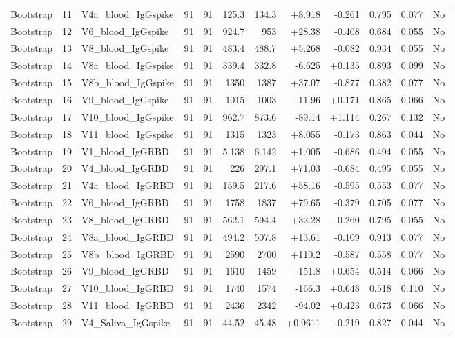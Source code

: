 \begin{landscape}
\begin{longtable}{@{}lrp{4.0cm}rrrrrrrrr@{}}
Bootstrap & 11 & V4a\_blood\_IgGspike & 91 & 91 & 125.3 & 134.3 & +8.918 & -0.261 & 0.795 & 0.077 & No \\
Bootstrap & 12 & V6\_blood\_IgGspike & 91 & 91 & 924.7 & 953 & +28.38 & -0.408 & 0.684 & 0.055 & No \\
Bootstrap & 13 & V8\_blood\_IgGspike & 91 & 91 & 483.4 & 488.7 & +5.268 & -0.082 & 0.934 & 0.055 & No \\
Bootstrap & 14 & V8a\_blood\_IgGspike & 91 & 91 & 339.4 & 332.8 & -6.625 & +0.135 & 0.893 & 0.099 & No \\
Bootstrap & 15 & V8b\_blood\_IgGspike & 91 & 91 & 1350 & 1387 & +37.07 & -0.877 & 0.382 & 0.077 & No \\
Bootstrap & 16 & V9\_blood\_IgGspike & 91 & 91 & 1015 & 1003 & -11.96 & +0.171 & 0.865 & 0.066 & No \\
Bootstrap & 17 & V10\_blood\_IgGspike & 91 & 91 & 962.7 & 873.6 & -89.14 & +1.114 & 0.267 & 0.132 & No \\
Bootstrap & 18 & V11\_blood\_IgGspike & 91 & 91 & 1315 & 1323 & +8.055 & -0.173 & 0.863 & 0.044 & No \\
Bootstrap & 19 & V1\_blood\_IgGRBD & 91 & 91 & 5.138 & 6.142 & +1.005 & -0.686 & 0.494 & 0.055 & No \\
Bootstrap & 20 & V4\_blood\_IgGRBD & 91 & 91 & 226 & 297.1 & +71.03 & -0.684 & 0.495 & 0.055 & No \\
Bootstrap & 21 & V4a\_blood\_IgGRBD & 91 & 91 & 159.5 & 217.6 & +58.16 & -0.595 & 0.553 & 0.077 & No \\
Bootstrap & 22 & V6\_blood\_IgGRBD & 91 & 91 & 1758 & 1837 & +79.65 & -0.379 & 0.705 & 0.077 & No \\
Bootstrap & 23 & V8\_blood\_IgGRBD & 91 & 91 & 562.1 & 594.4 & +32.28 & -0.260 & 0.795 & 0.055 & No \\
Bootstrap & 24 & V8a\_blood\_IgGRBD & 91 & 91 & 494.2 & 507.8 & +13.61 & -0.109 & 0.913 & 0.077 & No \\
Bootstrap & 25 & V8b\_blood\_IgGRBD & 91 & 91 & 2590 & 2700 & +110.2 & -0.587 & 0.558 & 0.077 & No \\
Bootstrap & 26 & V9\_blood\_IgGRBD & 91 & 91 & 1610 & 1459 & -151.8 & +0.654 & 0.514 & 0.066 & No \\
Bootstrap & 27 & V10\_blood\_IgGRBD & 91 & 91 & 1740 & 1574 & -166.3 & +0.648 & 0.518 & 0.110 & No \\
Bootstrap & 28 & V11\_blood\_IgGRBD & 91 & 91 & 2436 & 2342 & -94.02 & +0.423 & 0.673 & 0.066 & No \\
Bootstrap & 29 & V4\_Saliva\_IgGspike & 91 & 91 & 44.52 & 45.48 & +0.9611 & -0.219 & 0.827 & 0.044 & No \\

\end{longtable}
\end{landscape}
